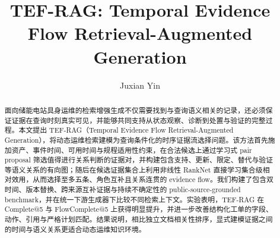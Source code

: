 \documentclass[letterpaper,10pt,conference]{IEEEtran}
\title{TEF-RAG: Temporal Evidence Flow Retrieval-Augmented Generation}
\author{Juxian Yin}
\begin{document}
\maketitle

\begin{abstract}
面向储能电站具身运维的检索增强生成不仅需要找到与查询语义相关的记录，还必须保证证据在查询时刻真实可见，并能够共同支持从状态观察、诊断到处置与验证的完整过程。本文提出 TEF-RAG（Temporal Evidence Flow Retrieval-Augmented Generation），将动态运维检索建模为查询条件化的时序证据流选择问题。该方法首先施加资产、事件时间、可用时间与规程适用性约束，在合法候选上通过学习式 pair proposal 筛选值得进行关系判断的证据对，并构建包含支持、更新、限定、替代与验证等语义关系的有向图；随后在候选证据集合上利用非线性 RankNet 直接学习集合级相对效用，从而选择至多五条、角色互补且关系连贯的 evidence flow。我们构建了包含双时间、版本替换、跨来源互补证据与持续不确定性的 public-source-grounded benchmark，并在统一下游生成器下比较不同检索上下文。实验表明，TEF-RAG 在 Complete@5 与 FlowComplete@5 上获得明显提升，并进一步改善结构化工单的字段、动作、引用与严格计划匹配。结果说明，相比独立文档相关性排序，显式建模证据之间的时间与语义关系更适合动态运维知识环境。
\end{abstract}







\newpage
\appendices

\end{document}
